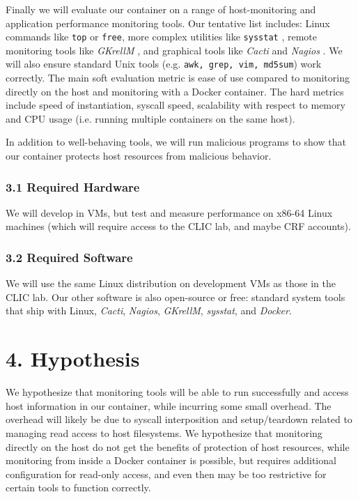 \documentclass{proc}
\begin{document}
Finally we will evaluate our container on a range of host-monitoring and application performance monitoring tools. Our tentative list includes: Linux commands like \texttt{top} or \texttt{free}, more complex utilities like \texttt{sysstat} \cite{sysstat}, remote monitoring tools like \textit{GKrellM} \cite{gkrellm}, and graphical tools like \textit{Cacti} \cite{cacti} and \textit{Nagios} \cite{nagios}. We will also ensure standard Unix tools (e.g. \texttt{awk, grep, vim, md5sum}) work correctly. The main soft evaluation metric is ease of use compared to monitoring directly on the host and monitoring with a Docker container. The hard metrics include speed of instantiation, syscall speed, scalability with respect to memory and CPU usage (i.e. running multiple containers on the same host).

In addition to well-behaving tools, we will run malicious programs to show that our container protects host resources from malicious behavior.

\subsubsection*{3.1 Required Hardware}

We will develop in VMs, but test and measure performance on x86-64 Linux machines (which will require access to the CLIC lab, and maybe CRF accounts).

\subsubsection*{3.2 Required Software}

We will use the same Linux distribution on development VMs as those in the CLIC lab. Our other software is also open-source or free: standard system tools that ship with Linux, \textit{Cacti}, \textit{Nagios}, \textit{GKrellM}, \textit{sysstat}, and \textit{Docker}.

\section*{4. Hypothesis}

We hypothesize that monitoring tools will be able to run successfully and access host information in our container, while incurring some small overhead. The overhead will likely be due to syscall interposition and setup/teardown related to managing read access to host filesystems. We hypothesize that monitoring directly on the host do not get the benefits of protection of host resources, while monitoring from inside a Docker container is possible, but requires additional configuration for read-only access, and even then may be too restrictive for certain tools to function correctly.
\end{document}
